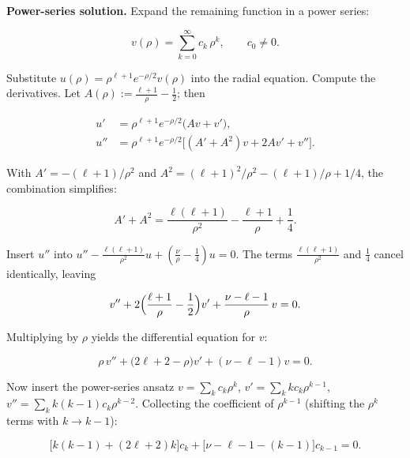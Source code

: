 \medskip\noindent\textbf{Power-series solution.} Expand the remaining function in a power series:
\begin{linenomath}
\begin{equation*}
v(\rho) = \sum_{k=0}^{\infty} c_k\,\rho^k, \qquad c_0 \neq 0 .
\end{equation*}
\end{linenomath}
Substitute $u(\rho) = \rho^{\ell+1}e^{-\rho/2}v(\rho)$ into the radial equation. Compute the derivatives. Let $A(\rho) := \frac{\ell+1}{\rho} - \frac{1}{2}$; then
\begin{linenomath}
\begin{align*}
u' &= \rho^{\ell+1}e^{-\rho/2}\bigl(A v + v'\bigr),\\
u'' &= \rho^{\ell+1}e^{-\rho/2}\bigl[(A' + A^2)v + 2A v' + v''\bigr].
\end{align*}
\end{linenomath}
With $A' = -(\ell+1)/\rho^2$ and $A^2 = (\ell+1)^2/\rho^2 - (\ell+1)/\rho + 1/4$, the combination simplifies:
\begin{linenomath}
\begin{equation*}
A' + A^2 = \frac{\ell(\ell+1)}{\rho^2} - \frac{\ell+1}{\rho} + \frac{1}{4}.
\end{equation*}
\end{linenomath}
Insert $u''$ into $u'' - \frac{\ell(\ell+1)}{\rho^2}u + (\frac{\nu}{\rho} - \frac{1}{4})u = 0$. The terms $\frac{\ell(\ell+1)}{\rho^2}$ and $\frac{1}{4}$ cancel identically, leaving
\begin{linenomath}
\begin{equation*}
v'' + 2\Bigl(\frac{\ell+1}{\rho} - \frac{1}{2}\Bigr)v' + \frac{\nu-\ell-1}{\rho}\,v = 0.
\end{equation*}
\end{linenomath}
Multiplying by $\rho$ yields the differential equation for $v$:
\begin{linenomath}
\begin{equation*}
\rho\,v'' + \bigl(2\ell+2 - \rho\bigr)v' + (\nu - \ell - 1)v = 0.
\end{equation*}
\end{linenomath}
Now insert the power-series ansatz $v = \sum_k c_k\rho^k$, $v' = \sum_k k c_k\rho^{k-1}$, $v'' = \sum_k k(k-1)c_k\rho^{k-2}$. Collecting the coefficient of $\rho^{k-1}$ (shifting the $\rho^k$ terms with $k \to k-1$):
\begin{linenomath}
\begin{equation*}
\bigl[k(k-1) + (2\ell+2)k\bigr]c_k
+ \bigl[\nu - \ell - 1 - (k-1)\bigr]c_{k-1} = 0.
\end{equation*}
\end{linenomath}
